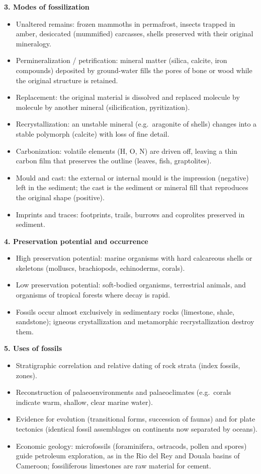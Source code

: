 \documentclass[11pt]{article}
\newcommand{\cle}[1]{{\popxbold\color{popdark}#1}}
\begin{document}
\begin{aretenir}
\textbf{3. Modes of fossilization}
\begin{itemize}
\item \cle{Unaltered remains}: frozen mammoths in permafrost, insects trapped in amber, desiccated (mummified) carcasses, shells preserved with their original mineralogy.
\item \cle{Permineralization / petrification}: mineral matter (silica, calcite, iron compounds) deposited by ground-water fills the pores of bone or wood while the original structure is retained.
\item \cle{Replacement}: the original material is dissolved and replaced molecule by molecule by another mineral (silicification, pyritization).
\item \cle{Recrystallization}: an unstable mineral (e.g.\ aragonite of shells) changes into a stable polymorph (calcite) with loss of fine detail.
\item \cle{Carbonization}: volatile elements (H, O, N) are driven off, leaving a thin carbon film that preserves the outline (leaves, fish, graptolites).
\item \cle{Mould and cast}: the external or internal mould is the impression (negative) left in the sediment; the cast is the sediment or mineral fill that reproduces the original shape (positive).
\item \cle{Imprints and traces}: footprints, trails, burrows and coprolites preserved in sediment.
\end{itemize}

\textbf{4. Preservation potential and occurrence}
\begin{itemize}
\item High preservation potential: marine organisms with hard calcareous shells or skeletons (molluscs, brachiopods, echinoderms, corals).
\item Low preservation potential: soft-bodied organisms, terrestrial animals, and organisms of tropical forests where decay is rapid.
\item Fossils occur almost exclusively in \cle{sedimentary rocks} (limestone, shale, sandstone); igneous crystallization and metamorphic recrystallization destroy them.
\end{itemize}

\textbf{5. Uses of fossils}
\begin{itemize}
\item \cle{Stratigraphic correlation} and relative dating of rock strata (index fossils, zones).
\item Reconstruction of \cle{palaeoenvironments} and palaeoclimates (e.g.\ corals indicate warm, shallow, clear marine water).
\item Evidence for \cle{evolution} (transitional forms, succession of faunas) and for plate tectonics (identical fossil assemblages on continents now separated by oceans).
\item Economic geology: microfossils (foraminifera, ostracods, pollen and spores) guide \cle{petroleum} exploration, as in the Rio del Rey and Douala basins of Cameroon; fossiliferous limestones are raw material for cement.
\end{itemize}


\end{aretenir}
\end{document}
